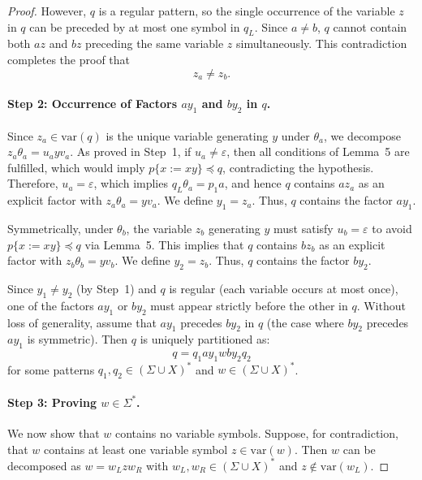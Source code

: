 {\begin{proof}
However, $q$ is a regular pattern, so the single occurrence of the variable $z$ in $q$ can be preceded by at most one symbol in $q_L$. Since $a \neq b$, $q$ cannot contain both $az$ and $bz$ preceding the same variable $z$ simultaneously.
This contradiction completes the proof that
\[
z_a \neq z_b.
\]

\paragraph{Step 2: Occurrence of Factors $a y_1$ and $b y_2$ in $q$.}
Since $z_a \in \mathrm{var}(q)$ is the unique variable generating $y$ under $\theta_a$, we decompose $z_a\theta_a = u_a y v_a$.
As proved in Step~1, if $u_a \neq \varepsilon$, then all conditions of Lemma~5 are fulfilled, which would imply $p\{x := xy\} \preceq q$, contradicting the hypothesis.
Therefore, $u_a = \varepsilon$, which implies $q_L\theta_a = p_1 a$, and hence $q$ contains $a z_a$ as an explicit factor with $z_a\theta_a = y v_a$. We define $y_1 = z_a$. Thus, $q$ contains the factor $a y_1$.

Symmetrically, under $\theta_b$, the variable $z_b$ generating $y$ must satisfy $u_b = \varepsilon$ to avoid $p\{x := xy\} \preceq q$ via Lemma~5. This implies that $q$ contains $b z_b$ as an explicit factor with $z_b\theta_b = y v_b$. We define $y_2 = z_b$. Thus, $q$ contains the factor $b y_2$.

Since $y_1 \neq y_2$ (by Step~1) and $q$ is regular (each variable occurs at most once), one of the factors $a y_1$ or $b y_2$ must appear strictly before the other in $q$.
Without loss of generality, assume that $a y_1$ precedes $b y_2$ in $q$ (the case where $b y_2$ precedes $a y_1$ is symmetric).
Then $q$ is uniquely partitioned as:
\[
q = q_1 a y_1 w b y_2 q_2
\]
for some patterns $q_1, q_2 \in (\Sigma \cup X)^*$ and $w \in (\Sigma \cup X)^*$.

\paragraph{Step 3: Proving $w \in \Sigma^*$.}
We now show that $w$ contains no variable symbols.
Suppose, for contradiction, that $w$ contains at least one variable symbol $z \in \mathrm{var}(w)$.
Then $w$ can be decomposed as $w = w_L z w_R$ with $w_L, w_R \in (\Sigma \cup X)^*$ and $z \notin \mathrm{var}(w_L)$.


\end{proof}}
